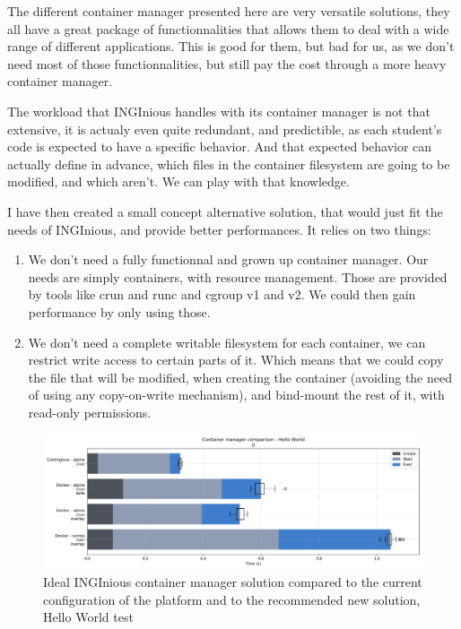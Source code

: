 The different container manager presented here are very versatile solutions, they all have a great package of functionnalities that allows them to deal with a wide range of different applications.  This is good for them, but bad for us, as we don't need most of those functionnalities, but still pay the cost through a more heavy container manager.

The workload that INGInious handles with its container manager is not that extensive, it is actualy even quite redundant, and predictible, as each student's code is expected to have a specific behavior.  And that expected behavior can actually define in advance, which files in the container filesystem are going to be modified, and which aren't.  We can play with that knowledge.

I have then created a small concept alternative solution, that would just fit the needs of INGInious, and provide better performances.  It relies on two things:
\begin{enumerate}
  \item We don't need a fully functionnal and grown up container manager. Our needs are simply containers, with resource management.  Those are provided by tools like crun and runc and cgroup v1 and v2.  We could then gain performance by only using those.
  \item We don't need a complete writable filesystem for each container, we can restrict write access to certain parts of it.  Which means that we could copy the file that will be modified, when creating the container (avoiding the need of using any copy-on-write mechanism), and bind-mount the rest of it, with read-only permissions.
\end{enumerate}

\begin{figure}[h!]
  \begin{center}
    \includegraphics[width=\linewidth]{images/question-2-hello-world.png}
    \caption{Ideal INGInious container manager solution compared to the current configuration of the platform and to the recommended new solution, Hello World test}
    \label{fig:q2:hello-world}
  \end{center}
\end{figure}

